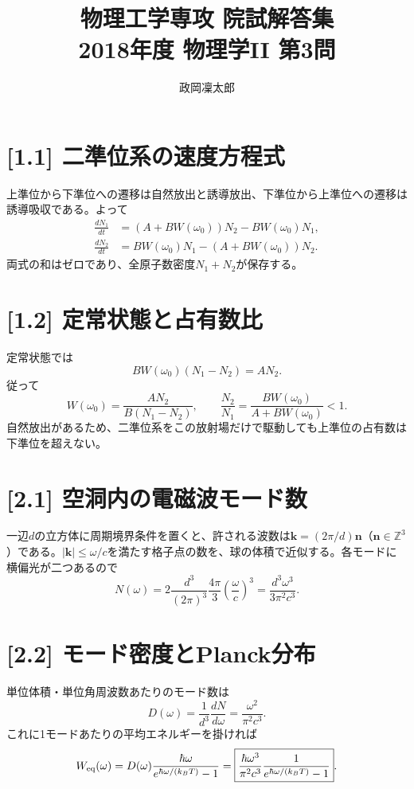 \documentclass[11pt,a4paper]{article}
\title{物理工学専攻 院試解答集\\2018年度 物理学II 第3問}
\author{政岡凜太郎}
\date{}
\begin{document}
\maketitle

\section*{[1.1] 二準位系の速度方程式}
上準位から下準位への遷移は自然放出と誘導放出、下準位から上準位への遷移は誘導吸収である。よって
\begin{align}
 \frac{dN_1}{dt}&=(A+BW(\omega_0))N_2-BW(\omega_0)N_1,\\
 \frac{dN_2}{dt}&=BW(\omega_0)N_1-(A+BW(\omega_0))N_2.
\end{align}
両式の和はゼロであり、全原子数密度$N_1+N_2$が保存する。

\section*{[1.2] 定常状態と占有数比}
定常状態では
\begin{equation}
 BW(\omega_0)(N_1-N_2)=AN_2.
\end{equation}
従って
\begin{equation}
 \boxed{W(\omega_0)=\frac{AN_2}{B(N_1-N_2)}},\qquad
 \frac{N_2}{N_1}=\frac{BW(\omega_0)}{A+BW(\omega_0)}<1.
\end{equation}
自然放出があるため、二準位系をこの放射場だけで駆動しても上準位の占有数は下準位を超えない。

\section*{[2.1] 空洞内の電磁波モード数}
一辺$d$の立方体に周期境界条件を置くと、許される波数は$\boldsymbol k=(2\pi/d)\boldsymbol n$（$\boldsymbol n\in\mathbb Z^3$）である。$|\boldsymbol k|\le\omega/c$を満たす格子点の数を、球の体積で近似する。各モードに横偏光が二つあるので
\begin{equation}
 N(\omega)=2\frac{d^3}{(2\pi)^3}\frac{4\pi}{3}\left(\frac{\omega}{c}\right)^3
 =\boxed{\frac{d^3\omega^3}{3\pi^2c^3}}.
\end{equation}

\section*{[2.2] モード密度とPlanck分布}
単位体積・単位角周波数あたりのモード数は
\begin{equation}
 D(\omega)=\frac{1}{d^3}\frac{dN}{d\omega}
 =\frac{\omega^2}{\pi^2c^3}.
\end{equation}
これに1モードあたりの平均エネルギーを掛ければ
\begin{equation}
 W_{\rm eq}(\omega)=D(\omega)\frac{\hbar\omega}{e^{\hbar\omega/(k_BT)}-1}
 =\boxed{\frac{\hbar\omega^3}{\pi^2c^3}\frac{1}{e^{\hbar\omega/(k_BT)}-1}}.
\end{equation}
\end{document}
